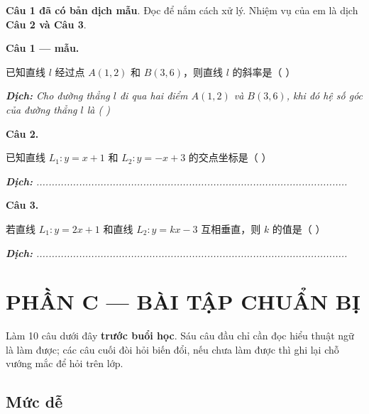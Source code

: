 \documentclass[11pt, a4paper]{article}
\begin{document}
\textbf{Câu 1 đã có bản dịch mẫu}. Đọc để nắm cách xử lý. Nhiệm vụ của em là dịch \textbf{Câu 2 và Câu 3}.

\textbf{Câu 1 — mẫu.}

已知直线 $l$ 经过点 $A(1,2)$ 和 $B(3,6)$，则直线 $l$ 的斜率是（ ）

\noindent\emph{\textbf{Dịch:} Cho đường thẳng $l$ đi qua hai điểm $A(1,2)$ và $B(3,6)$, khi đó hệ số góc của đường thẳng $l$ là ( )}

\textbf{Câu 2.}

已知直线 $L_1: y = x + 1$ 和 $L_2: y = -x + 3$ 的交点坐标是（ ）

\noindent\emph{\textbf{Dịch:} ......................................................................................................}

\textbf{Câu 3.}

若直线 $L_1: y = 2x + 1$ 和直线 $L_2: y = kx - 3$ 互相垂直，则 $k$ 的值是（ ）

\noindent\emph{\textbf{Dịch:} ......................................................................................................}

\section{PHẦN C — BÀI TẬP CHUẨN BỊ}

Làm 10 câu dưới đây \textbf{trước buổi học}. Sáu câu đầu chỉ cần đọc hiểu thuật ngữ là làm được; các câu cuối đòi hỏi biến đổi, nếu chưa làm được thì ghi lại chỗ vướng mắc để hỏi trên lớp.

\subsection{Mức dễ}
\end{document}
